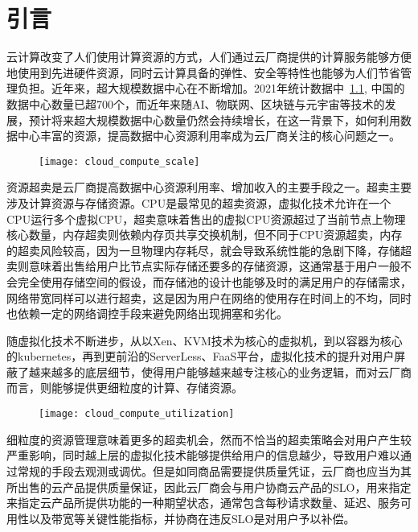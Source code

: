 \chapter{引言}\label{chap:introduction}

云计算改变了人们使用计算资源的方式，人们通过云厂商提供的计算服务能够方便地使用到先进硬件资源，同时云计算具备的弹性、安全等特性也能够为人们节省管理负担。近年来，超大规模数据中心在不断增加。2021年统计数据中~\ref{fig:cloud_compute_scale}, 中国的数据中心数量已超700个，而近年来随AI、物联网、区块链与元宇宙等技术的发展，预计将来超大规模数据中心数量仍然会持续增长，在这一背景下，如何利用数据中心丰富的资源，提高数据中心资源利用率成为云厂商关注的核心问题之一。

\begin{figure}[!htbp]
    \centering
    \texttt{[image: cloud\_compute\_scale]}
    \label{fig:cloud_compute_scale}
\end{figure}

资源超卖是云厂商提高数据中心资源利用率、增加收入的主要手段之一。超卖主要涉及计算资源与存储资源。CPU是最常见的超卖资源，虚拟化技术允许在一个CPU运行多个虚拟CPU，超卖意味着售出的虚拟CPU资源超过了当前节点上物理核心数量，内存超卖则依赖内存页共享交换机制，但不同于CPU资源超卖，内存的超卖风险较高，因为一旦物理内存耗尽，就会导致系统性能的急剧下降，存储超卖则意味着出售给用户比节点实际存储还要多的存储资源，这通常基于用户一般不会完全使用存储空间的假设，而存储池的设计也能够及时的满足用户的存储需求，网络带宽同样可以进行超卖，这是因为用户在网络的使用存在时间上的不均，同时也依赖一定的网络调控手段来避免网络出现拥塞和劣化。

随虚拟化技术不断进步，从以Xen、KVM技术为核心的虚拟机，到以容器为核心的kubernetes，再到更前沿的ServerLess、FaaS平台，虚拟化技术的提升对用户屏蔽了越来越多的底层细节，使得用户能够越来越专注核心的业务逻辑，而对云厂商而言，则能够提供更细粒度的计算、存储资源。

\begin{figure}[!htbp]
    \centering
    \texttt{[image: cloud\_compute\_utilization]}
    \label{fig:cloud_compute_utilization}
\end{figure}

细粒度的资源管理意味着更多的超卖机会，然而不恰当的超卖策略会对用户产生较严重影响，同时越上层的虚拟化技术能够提供给用户的信息越少，导致用户难以通过常规的手段去观测或调优。但是如同商品需要提供质量凭证，云厂商也应当为其所出售的云产品提供质量保证，因此云厂商会与用户协商云产品的SLO，用来指定来指定云产品所提供功能的一种期望状态，通常包含每秒请求数量、延迟、服务可用性以及带宽等关键性能指标，并协商在违反SLO是对用户予以补偿。

